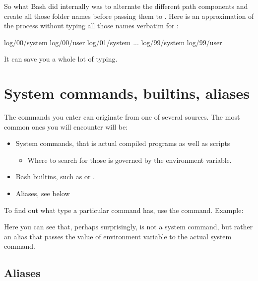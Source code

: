 \documentclass{olli-handout}
\begin{document}
So what Bash did internally was to alternate the different path components and create all those folder names before passing them to . Here is an approximation of the process without typing all those names verbatim for :

\begin{GenericListing}
log/00/system
log/00/user
log/01/system
...
log/99/system
log/99/user
\end{GenericListing}

It can save you a whole lot of typing.

\section{System commands, builtins, aliases}

\begin{refmanbash}
\end{refmanbash}

The commands you enter can originate from one of several sources. The most common ones you will encounter will be:

\begin{itemize}
	\item System commands, that is actual compiled programs as well as scripts
    \begin{itemize}
        \item[\olliPenR] Where to search for those is governed by the  environment variable.
    \end{itemize}
	\item Bash builtins, such as  or .
	\item Aliases, see below
\end{itemize}

To find out what type a particular command has, use the  command. Example:


Here you can see that, perhaps surprisingly,  is not a system command, but rather an alias that passes the value of environment variable  to the actual  system command.

\subsection{Aliases}
\end{document}
